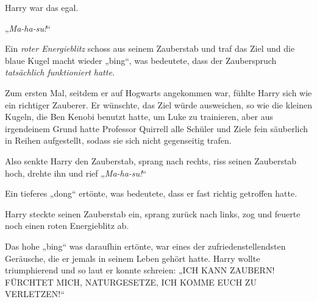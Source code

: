 Harry war das egal.

„\emph{Ma-ha-su!}“

Ein \emph{roter Energieblitz} schoss aus seinem Zauberstab und traf das Ziel und die blaue Kugel macht wieder „bing“, was bedeutete, dass der Zauberspruch \emph{tatsächlich funktioniert hatte.}

Zum ersten Mal, seitdem er auf Hogwarts angekommen war, fühlte Harry sich wie ein richtiger Zauberer. Er wünschte, das Ziel würde ausweichen, so wie die kleinen Kugeln, die Ben Kenobi benutzt hatte, um Luke zu trainieren, aber aus irgendeinem Grund hatte Professor Quirrell alle Schüler und Ziele fein säuberlich in Reihen aufgestellt, sodass sie sich nicht gegenseitig trafen.

Also senkte Harry den Zauberstab, sprang nach rechts, riss seinen Zauberstab hoch, drehte ihn und rief „\emph{Ma-ha-su!}“

Ein tieferes „dong“ ertönte, was bedeutete, dass er fast richtig getroffen hatte.

Harry steckte seinen Zauberstab ein, sprang zurück nach links, zog und feuerte noch einen roten Energieblitz ab.

Das hohe „bing“ was daraufhin ertönte, war eines der zufriedenstellendsten Geräusche, die er jemals in seinem Leben gehört hatte. Harry wollte triumphierend und so laut er konnte schreien: „ICH KANN ZAUBERN! FÜRCHTET MICH, NATURGESETZE, ICH KOMME EUCH ZU VERLETZEN!“

